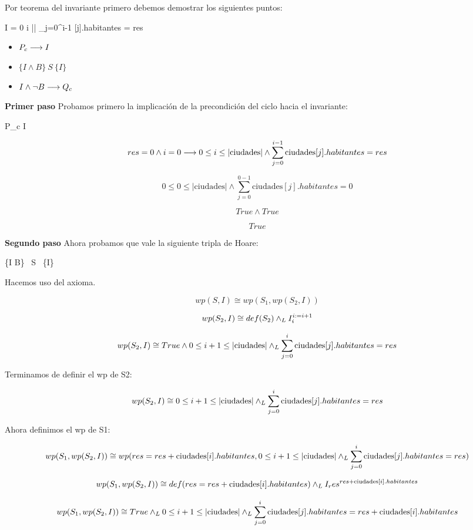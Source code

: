 \documentclass[10pt,a4paper]{article}
\begin{document}
Por teorema del invariante primero debemos demostrar los siguientes puntos:

I = 0 \leq i \leq || \land \sum_{j=0}^{i-1} [j].habitantes = res

\begin{itemize}
    \item \( P_c \longrightarrow I \)
    \item \( \{I \land B\} \ S \ \{I\} \)
    \item \( I \land \neg B \longrightarrow Q_c \)
\end{itemize}

\textbf{Primer paso} Probamos primero la implicación de la precondición del ciclo hacia el invariante:

P_c \implica I

\[
res = 0 \land i = 0 \longrightarrow 0 \leq i \leq |\text{ciudades}| \land \sum_{j=0}^{i-1} \text{ciudades}[j].habitantes = res
\]

\[
 0 \leq 0 \leq |\text{ciudades}| \land \sum_{j=0}^{0-1} \text{ciudades}[j].habitantes = 0
\]

\[
True \land True
\]

\[
True
\]

\textbf{Segundo paso} Ahora probamos que vale la siguiente tripla de Hoare:

\{I \land B\} \ S \ \{I\}

Hacemos uso del axioma.

\[
wp(S, I) \cong wp(S_1, wp(S_2, I))
\]

\[
wp(S_2, I) \cong def(S_2) \land _L I_i^{i := i+1}
\]

\[
wp(S_2, I) \cong True \land 0 \leq i+1 \leq |\text{ciudades}| \land _L \sum_{j=0}^{i} \text{ciudades}[j].habitantes = res
\]

Terminamos de definir el wp de S2:

\[
wp(S_2, I) \cong 0 \leq i+1 \leq |\text{ciudades}| \land _L \sum_{j=0}^{i} \text{ciudades}[j].habitantes = res
\]

Ahora definimos el wp de S1:

\[
wp(S_1, wp(S_2, I)) \cong wp(res = res + \text{ciudades}[i].habitantes, 0 \leq i+1 \leq |\text{ciudades}| \land _L \sum_{j=0}^{i} \text{ciudades}[j].habitantes = res)
\]

\[
wp(S_1, wp(S_2, I)) \cong def(res = res + \text{ciudades}[i].habitantes) \land _L I_res^{res + \text{ciudades}[i].habitantes}
\]

\[
wp(S_1, wp(S_2, I)) \cong True \land _L 0 \leq i+1 \leq |\text{ciudades}| \land _L \sum_{j=0}^{i} \text{ciudades}[j].habitantes = res + \text{ciudades}[i].habitantes
\]
\end{document}
